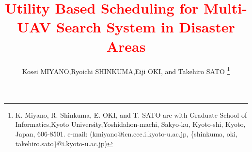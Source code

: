 \documentclass[journal]{IEEEtran}
\begin{document}
%
\title{\textcolor{red}{Utility Based Scheduling for Multi-UAV Search System in Disaster Areas}}
%
%
%

\author{Kosei MIYANO,Ryoichi SHINKUMA,Eiji OKI, and Takehiro SATO
\thanks{K. Miyano, R. Shinkuma, E. OKI, and T. SATO are with Graduate School of
Informatics,Kyoto University,Yoshidahon-machi, Sakyo-ku, Kyoto-shi,
Kyoto, Japan, 606-8501.
e-mail: (kmiyano@icn.cce.i.kyoto-u.ac.jp, \{shinkuma, oki, takehiro.sato\}@i.kyoto-u.ac.jp)}}

% 
%
\end{document}
